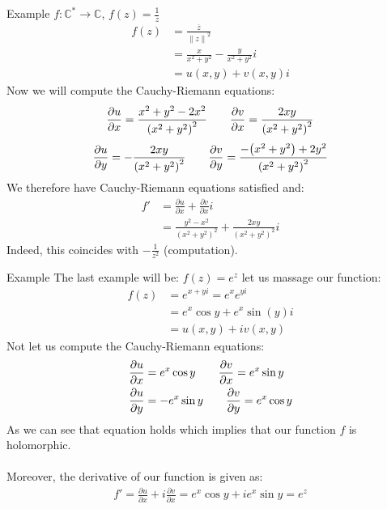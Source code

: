 \begin{parag}{Example}
    $f : \mathbb{C}^{\ast} \to \mathbb{C}$, $f\left(z\right) = \frac{1}{z} $
	\begin{align*} 
		f\left(z\right) &= \frac{\overline{z}}{\left\|z\right\|^2}\\
						&= \frac{x}{x^2 + y^2} - \frac{y}{x^2 + y^2}i\\
						&= u\left(x, y\right) + v\left(x, y\right)i
	\end{align*}
	Now we will compute the Cauchy-Riemann equations:
	\begin{align*} 
		\frac{\partial u}{\partial x} = \frac{x^2 + y^2 - 2x^2}{\left(x^2 + y^2\right)^2} \mathspace \mathspace \frac{\partial v}{\partial x} = \frac{2xy}{\left(x^2 + y^2\right)^2}
	\end{align*}
	\begin{align*} 
		\frac{\partial u}{\partial y} = -\frac{2xy}{\left(x^2 + y^2\right)^2} \mathspace \mathspace \frac{\partial v}{\partial y} = \frac{-\left(x^2 + y^2\right) + 2y^2}{\left(x^2 + y^2\right)^2}
	\end{align*}
	We therefore have Cauchy-Riemann equations satisfied and:
	\begin{align*} 
		f' &= \frac{\partial u}{\partial x}  + \frac{\partial v}{\partial x} i \\
			&= \frac{y^2 - x^2}{\left(x^2 + y^2\right)^2} + \frac{2xy}{\left(x^2 + y^2\right)^2}i
	\end{align*}
	Indeed, this coincides with $-\frac{1}{z^2}$ (computation).
\end{parag}

\begin{parag}{Example}
	The last example will be: $f\left(z\right) =  e^{z}$ let us massage our function:
	\begin{align*} 
		f\left(z\right) &= e^{x + yi} = e^{x}e^{yi}\\
						&= e^{x}\cos y + e^{x}\sin \left(y\right) i\\
						&= u\left(x, y\right) + iv\left(x, y\right)
	\end{align*}
	Not let us compute the Cauchy-Riemann equations:
	\begin{align*} 
		\frac{\partial u}{\partial x} &= e^{x}\cos y \quad \quad \frac{\partial v}{\partial x} = e^{x}\sin y \\
		\frac{\partial u}{\partial y} &= -e^{x}\sin y \quad \quad \frac{\partial v}{\partial y} = e^{x}\cos y
	\end{align*}
	As we can see that equation holds which implies that our function $f$ is holomorphic.\\
	$ $\\
	Moreover, the derivative of our function is given as:
	\begin{align*} 
		f' = \frac{\partial u}{\partial x} + i \frac{\partial v}{\partial x} = e^{x}\cos y + ie^{x}\sin y = e^{z}
	\end{align*}
\end{parag}

